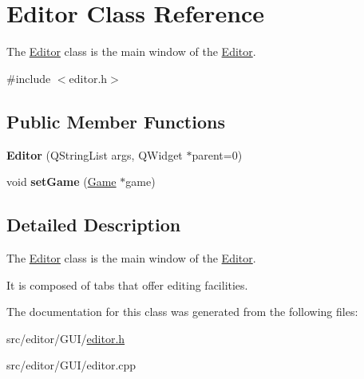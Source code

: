 \hypertarget{class_editor}{\section{\-Editor \-Class \-Reference}
\label{class_editor}
}


\-The \hyperlink{class_editor}{\-Editor} class is the main window of the \hyperlink{class_editor}{\-Editor}.  




{\ttfamily \#include $<$editor.\-h$>$}

\subsection*{\-Public \-Member \-Functions}
\begin{DoxyCompactItemize}
\item 
\hypertarget{class_editor_a7332320d22be46fb91bf0471dac0279b}{{\bfseries \-Editor} (\-Q\-String\-List args, \-Q\-Widget $\ast$parent=0)}\label{class_editor_a7332320d22be46fb91bf0471dac0279b}

\item 
\hypertarget{class_editor_a5b1acc0fb7341c9456deebb33e1ee202}{void {\bfseries set\-Game} (\hyperlink{class_game}{\-Game} $\ast$game)}\label{class_editor_a5b1acc0fb7341c9456deebb33e1ee202}

\end{DoxyCompactItemize}


\subsection{\-Detailed \-Description}
\-The \hyperlink{class_editor}{\-Editor} class is the main window of the \hyperlink{class_editor}{\-Editor}. 

\-It is composed of tabs that offer editing facilities. 

\-The documentation for this class was generated from the following files\-:\begin{DoxyCompactItemize}
\item 
src/editor/\-G\-U\-I/\hyperlink{editor_8h}{editor.\-h}\item 
src/editor/\-G\-U\-I/editor.\-cpp\end{DoxyCompactItemize}
